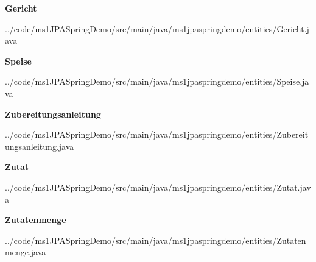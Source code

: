 \begin{mdframed}[style=codebox]
\textbf{Gericht}

{../code/ms1JPASpringDemo/src/main/java/ms1jpaspringdemo/entities/Gericht.java}
\end{mdframed}
\begin{mdframed}[style=codebox]
\textbf{Speise}

{../code/ms1JPASpringDemo/src/main/java/ms1jpaspringdemo/entities/Speise.java}
\end{mdframed}
\begin{mdframed}[style=codebox]
\textbf{Zubereitungsanleitung}

{../code/ms1JPASpringDemo/src/main/java/ms1jpaspringdemo/entities/Zubereitungsanleitung.java}
\end{mdframed}
\begin{mdframed}[style=codebox]
\textbf{Zutat}

{../code/ms1JPASpringDemo/src/main/java/ms1jpaspringdemo/entities/Zutat.java}
\end{mdframed}
\begin{mdframed}[style=codebox]
\textbf{Zutatenmenge}

{../code/ms1JPASpringDemo/src/main/java/ms1jpaspringdemo/entities/Zutatenmenge.java}
\end{mdframed}
